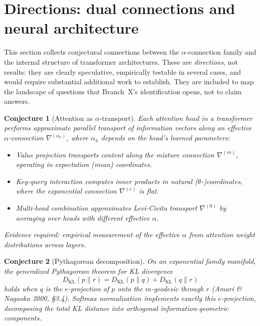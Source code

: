\documentclass[11pt]{article}
\newcommand{\DKL}{D_{\mathrm{KL}}}
\newtheorem{conjecture}{Conjecture}
\theoremstyle{remark}
\begin{document}
\section{Directions: dual connections and neural architecture}
\label{sec:directions}

This section collects conjectural connections between the $\alpha$-connection
family and the internal structure of transformer architectures.  These are
\emph{directions}, not results: they are clearly speculative, empirically
testable in several cases, and would require substantial additional work to
establish.  They are included to map the landscape of questions that
Branch~X's identification opens, not to claim answers.

\begin{conjecture}[Attention as $\alpha$-transport]
\label{conj:attention-transport}
Each attention head in a transformer performs approximate parallel transport of
information vectors along an effective $\alpha$-connection
$\nabla^{(\alpha_h)}$, where $\alpha_h$ depends on the head's learned
parameters:
\begin{itemize}
  \item Value projection transports content along the mixture connection
  $\nabla^{(m)}$, operating in expectation (mean) coordinates.
  \item Key-query interaction computes inner products in natural
  ($\theta$-)coordinates, where the exponential connection $\nabla^{(e)}$
  is flat.
  \item Multi-head combination approximates Levi-Civita transport
  $\nabla^{(0)}$ by averaging over heads with different effective $\alpha$.
\end{itemize}
Evidence required: empirical measurement of the effective $\alpha$ from
attention weight distributions across layers.
\end{conjecture}

\begin{conjecture}[Pythagorean decomposition]
\label{conj:pythagorean}
On an exponential family manifold, the generalized Pythagorean theorem for KL
divergence
\[
\DKL(p \| r) = \DKL(p \| q) + \DKL(q \| r)
\]
holds when $q$ is the $e$-projection of $p$ onto the $m$-geodesic through $r$
(Amari \& Nagaoka 2000, \S3.4).  Softmax normalization implements exactly this
$e$-projection, decomposing the total KL distance into orthogonal
information-geometric components.
\end{conjecture}
\end{document}
